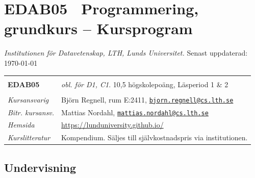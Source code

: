 \documentclass[a4paper,12pt,oneside]{memoir}
\newcommand{\YEAR}{\CurrentYear}
\begin{document}

\newcommand{\Kurskod}{EDAB05}
\section*{\Kurskod~ Programmering, grundkurs  -- Kursprogram \YEAR}
\emph{Institutionen för Datavetenskap, LTH, Lunds Universitet.} Senast uppdaterad: \today\\

\begin{longtable}[l]{ll}
\hline\\[-0.75em]%

\textbf{\Kurskod} & \textit{obl. för D1, C1}. 10,5 högskolepoäng, Läsperiod 1 \& 2 \\[-0.75em] \tabularnewline
\hline%
\endhead
\emph{Kursansvarig}   & Björn Regnell, rum E:2411,
                        \href{mailto:bjorn.regnell@cs.lth.se}
                        {\nolinkurl{bjorn.regnell@cs.lth.se}}\\
\emph{Bitr. kursansv.}   & Mattias Nordahl,
                        \href{mailto:mattias.nordahl@cs.lth.se}
                        {\nolinkurl{mattias.nordahl@cs.lth.se}}\tabularnewline
                        \emph{Hemsida}        
                        & \url{https://lunduniversity.github.io/}\tabularnewline
\emph{Kurslitteratur} & Kompendium. Säljes till självkostnadspris via institutionen.\tabularnewline

\hline
\end{longtable}

\subsection{Undervisning}\label{undervisning}
\end{document}
